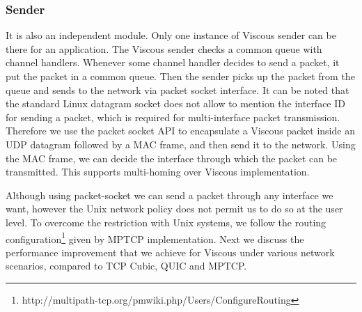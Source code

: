 \subsubsection{Sender}
It is also an independent module. Only one instance of Viscous sender can be there for an application. The Viscous sender checks a common queue with channel handlers. Whenever some channel handler decides to send a packet, it put the packet in a common queue. Then the sender picks up the packet from the queue and sends to the network via packet socket interface. It can be noted that the standard Linux datagram socket does not allow to mention the interface ID for sending a packet, which is required for multi-interface packet transmission. Therefore we use the packet socket API to encapsulate a Viscous packet inside an UDP datagram followed by a MAC frame, and then send it to the network. Using the MAC frame, we can decide the interface through which the packet can be transmitted. This supports multi-homing over Viscous implementation.  
%

Although using packet-socket we can send a packet through any interface we want, however the Unix network policy does not permit us to do so at the user level. To overcome the restriction with Unix systems, we follow the routing configuration\footnote{http://multipath-tcp.org/pmwiki.php/Users/ConfigureRouting} given by MPTCP implementation. Next we discuss the performance improvement that we achieve for Viscous under various network scenarios, compared to TCP Cubic, QUIC and MPTCP. 

